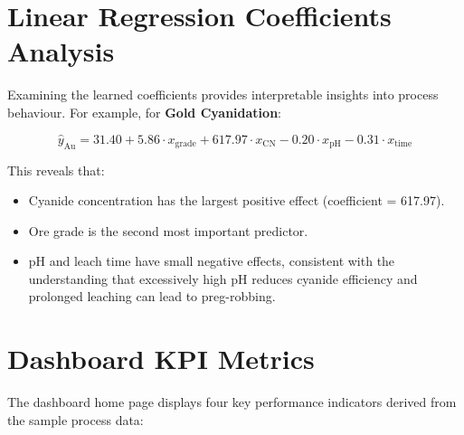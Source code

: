 \documentclass[12pt,a4paper]{report}
\begin{document}
\section{Linear Regression Coefficients Analysis}

Examining the learned coefficients provides interpretable insights into process behaviour. For example, for \textbf{Gold Cyanidation}:

\begin{equation}
  \hat{y}_{\text{Au}} = 31.40 + 5.86 \cdot x_{\text{grade}} + 617.97 \cdot x_{\text{CN}} - 0.20 \cdot x_{\text{pH}} - 0.31 \cdot x_{\text{time}}
\end{equation}

This reveals that:
\begin{itemize}[nosep]
  \item Cyanide concentration has the largest positive effect (coefficient = 617.97).
  \item Ore grade is the second most important predictor.
  \item pH and leach time have small negative effects, consistent with the understanding that excessively high pH reduces cyanide efficiency and prolonged leaching can lead to preg-robbing.
\end{itemize}

\section{Dashboard KPI Metrics}

The dashboard home page displays four key performance indicators derived from the sample process data:
\end{document}

